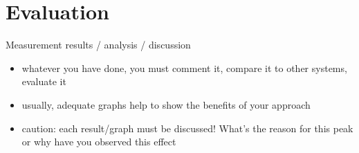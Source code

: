 \chapter{Evaluation}

Measurement results / analysis / discussion

\begin{itemize}
    \item whatever you have done, you must comment it, compare it to other systems, evaluate it
    \item usually, adequate graphs help to show the benefits of your approach
    \item caution: each result/graph must be discussed! What's the reason for this peak or why have you observed this effect 
\end{itemize}
